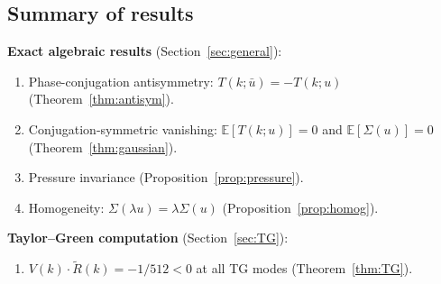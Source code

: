\documentclass[11pt]{article}
\theoremstyle{definition}
\newcommand{\E}{\mathbb{E}}
\begin{document}
\subsection{Summary of results}

\noindent\textbf{Exact algebraic results}
(Section~\ref{sec:general}):
\begin{enumerate}[leftmargin=2em,label=(A\arabic*)]
\item Phase-conjugation antisymmetry:
  $T(k;\bar u) = -T(k;u)$
  (Theorem~\ref{thm:antisym}).
\item Conjugation-symmetric vanishing: $\E[T(k;u)] = 0$
  and $\E[\Sigma(u)]=0$
  (Theorem~\ref{thm:gaussian}).
\item Pressure invariance
  (Proposition~\ref{prop:pressure}).
\item Homogeneity: $\Sigma(\lambda u)=\lambda\Sigma(u)$
  (Proposition~\ref{prop:homog}).
\end{enumerate}

\noindent\textbf{Taylor--Green computation}
(Section~\ref{sec:TG}):
\begin{enumerate}[leftmargin=2em,label=(B\arabic*)]
\item $V(k)\cdot\widetilde R(k)=-1/512 < 0$ at all
  TG modes (Theorem~\ref{thm:TG}).
\end{enumerate}
\end{document}
